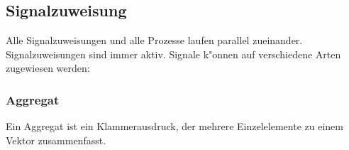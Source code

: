 	\subsection{Signalzuweisung}
		Alle Signalzuweisungen und alle Prozesse laufen parallel zueinander. 	
		Signalzuweisungen sind immer aktiv. Signale k"onnen auf verschiedene Arten 	
		zugewiesen werden:
		\begin{multicols}{2}
			
		\end{multicols}
		\subsubsection{Aggregat}
			Ein Aggregat ist ein Klammerausdruck, der mehrere Einzelelemente zu einem 
			Vektor zusammenfasst.
			\begin{multicols}{2}
			
			\end{multicols}
		


